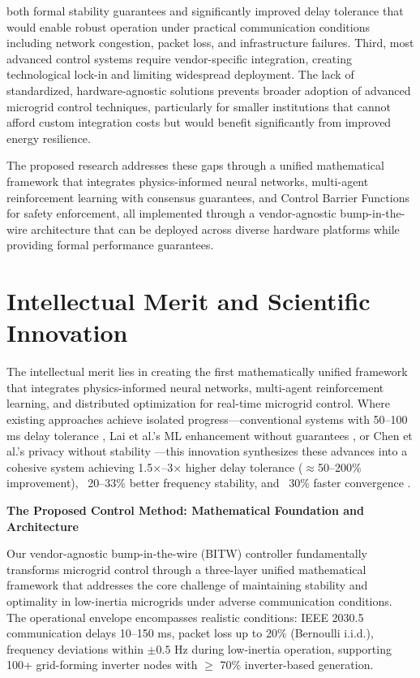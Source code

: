\documentclass[12pt]{article}
\begin{document}
both formal stability guarantees and significantly improved delay tolerance that would enable robust operation under practical communication conditions including network congestion, packet loss, and infrastructure failures. Third, most advanced control systems require vendor-specific integration, creating technological lock-in and limiting widespread deployment. The lack of standardized, hardware-agnostic solutions prevents broader adoption of advanced microgrid control techniques, particularly for smaller institutions that cannot afford custom integration costs but would benefit significantly from improved energy resilience.

The proposed research addresses these gaps through a unified mathematical framework that integrates physics-informed neural networks, multi-agent reinforcement learning with consensus guarantees, and Control Barrier Functions for safety enforcement, all implemented through a vendor-agnostic bump-in-the-wire architecture that can be deployed across diverse hardware platforms while providing formal performance guarantees.
\vspace{-0.5cm}
\section{Intellectual Merit and Scientific Innovation}

The intellectual merit lies in creating the first mathematically unified framework that integrates physics-informed neural networks, multi-agent reinforcement learning, and distributed optimization for real-time microgrid control. Where existing approaches achieve isolated progress---conventional systems with 50--100 ms delay tolerance \cite{bidram2012,simpson2013,riverso2013}, Lai et al.'s ML enhancement without guarantees \cite{lai2023}, or Chen et al.'s privacy without stability \cite{chen2024}---this innovation synthesizes these advances into a cohesive system achieving 1.5×--3× higher delay tolerance ($\approx$50--200\% improvement), ~20--33\% better frequency stability, and ~30\% faster convergence \cite{bevrani2021,palizban2014,our2024comparative}.

\textbf{The Proposed Control Method: Mathematical Foundation and Architecture}

Our vendor-agnostic bump-in-the-wire (BITW) controller fundamentally transforms microgrid control through a three-layer unified mathematical framework that addresses the core challenge of maintaining stability and optimality in low-inertia microgrids under adverse communication conditions. The operational envelope encompasses realistic conditions: IEEE 2030.5 communication delays 10--150 ms, packet loss up to 20\% (Bernoulli i.i.d.), frequency deviations within $\pm 0.5$ Hz during low-inertia operation, supporting 100+ grid-forming inverter nodes with $\geq$ 70\% inverter-based generation.
\end{document}
